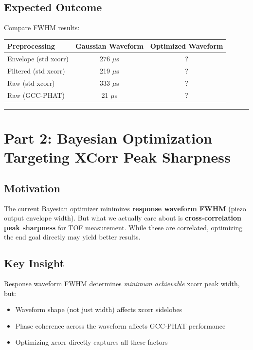 \documentclass[11pt]{article}
\begin{document}
\subsection{Expected Outcome}
Compare FWHM results:

\begin{table}[h]
\centering
\begin{tabular}{lcc}
\toprule
Preprocessing & Gaussian Waveform & Optimized Waveform \\
\midrule
Envelope (std xcorr) & 276 $\mu$s & ? \\
Filtered (std xcorr) & 219 $\mu$s & ? \\
Raw (std xcorr) & 333 $\mu$s & ? \\
Raw (GCC-PHAT) & 21 $\mu$s & ? \\
\bottomrule
\end{tabular}
\end{table}

\hrule
\vspace{1em}

\section{Part 2: Bayesian Optimization Targeting XCorr Peak Sharpness}

\subsection{Motivation}
The current Bayesian optimizer minimizes \textbf{response waveform FWHM} (piezo output envelope width). But what we actually care about is \textbf{cross-correlation peak sharpness} for TOF measurement. While these are correlated, optimizing the end goal directly may yield better results.

\subsection{Key Insight}
Response waveform FWHM determines \textit{minimum achievable} xcorr peak width, but:
\begin{itemize}
    \item Waveform shape (not just width) affects xcorr sidelobes
    \item Phase coherence across the waveform affects GCC-PHAT performance
    \item Optimizing xcorr directly captures all these factors
\end{itemize}
\end{document}
